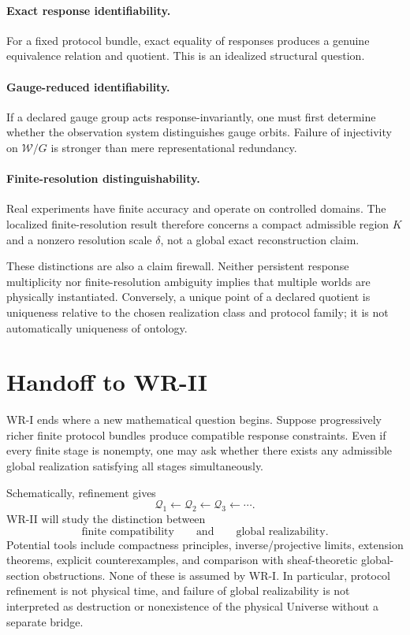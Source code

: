 \documentclass[11pt]{article}
\newcommand{\W}{\mathcal W}
\begin{document}
\paragraph{Exact response identifiability.}
For a fixed protocol bundle, exact equality of responses produces a genuine
equivalence relation and quotient. This is an idealized structural question.

\paragraph{Gauge-reduced identifiability.}
If a declared gauge group acts response-invariantly, one must first determine
whether the observation system distinguishes gauge orbits. Failure of
injectivity on $\W/G$ is stronger than mere representational redundancy.

\paragraph{Finite-resolution distinguishability.}
Real experiments have finite accuracy and operate on controlled domains. The
localized finite-resolution result therefore concerns a compact admissible
region $K$ and a nonzero resolution scale $\delta$, not a global exact
reconstruction claim.

These distinctions are also a claim firewall. Neither persistent response
multiplicity nor finite-resolution ambiguity implies that multiple worlds are
physically instantiated. Conversely, a unique point of a declared quotient is
uniqueness relative to the chosen realization class and protocol family; it is
not automatically uniqueness of ontology.

\section{Handoff to WR-II}

WR-I ends where a new mathematical question begins. Suppose progressively richer
finite protocol bundles produce compatible response constraints. Even if every
finite stage is nonempty, one may ask whether there exists any admissible global
realization satisfying all stages simultaneously.

Schematically, refinement gives
\[
\mathcal Q_1
\longleftarrow
\mathcal Q_2
\longleftarrow
\mathcal Q_3
\longleftarrow\cdots.
\]
WR-II will study the distinction between
\[
\text{finite compatibility}
\qquad\text{and}\qquad
\text{global realizability}.
\]
Potential tools include compactness principles, inverse/projective limits,
extension theorems, explicit counterexamples, and comparison with
sheaf-theoretic global-section obstructions. None of these is assumed by WR-I.
In particular, protocol refinement is not physical time, and failure of global
realizability is not interpreted as destruction or nonexistence of the physical
Universe without a separate bridge.
\end{document}
